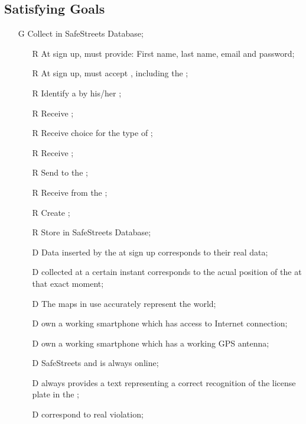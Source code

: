 \documentclass[../../../rasd.tex]{subfiles}
\begin{document}
\subsection{Satisfying Goals\label{sect:3.2.6}}
\begin{itemize}
	\item[G\subs{1}]Collect  in SafeStreets Database;
	\begin{itemize}
		\item[R\subs{1}]At sign up,  must provide: First name, last name, email and password;
		\item[R\subs{2}]At sign up,  must accept , including the ;
		\item[R\subs{3}]Identify a  by his/her ;
		\item[R\subs{4}]Receive ;
		\item[R\subs{5}]Receive  choice for the type of ;
		\item[R\subs{6}]Receive ;
		\item[R\subs{7}]Send  to the ;
		\item[R\subs{8}]Receive  from the ;
		\item[R\subs{9}]Create ;
		\item[R\subs{10}]Store  in SafeStreets Database;
		\\
		\item[D\subs{1}]Data inserted by the  at sign up corresponds to their real data;
		\item[D\subs{2}] collected at a certain instant corresponds to the acual position of the  at that exact moment;
		\item[D\subs{3}]The maps in use accurately represent the world;
		\item[D\subs{4}] own a working smartphone which has access to Internet connection;
		\item[D\subs{5}] own a working smartphone which has a working GPS antenna;
		\item[D\subs{6}]SafeStreets and  is always online;
		\item[D\subs{7}] always provides a text representing a correct recognition of the license plate in the ;
		\item[D\subs{9}] correspond to real violation;
	\end{itemize}


\end{itemize}
\end{document}
